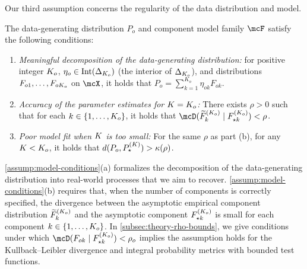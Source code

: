 
Our third assumption concerns the regularity of the data distribution and model.
\begin{assumption} \label{assump:model-conditions}
	The data-generating distribution $P_o$ and component model family $\mcF$ satisfy the following conditions:
	\begin{enumerate}[label=\textnormal{(\alph*)}]
		\item \emph{Meaningful decomposition of the data-generating distribution:} for positive integer $K_{o}$, $\eta_{o} \in \operatorname{Int}({\Delta_{K_o}})$ (the interior of $\Delta_{K_o}$), and distributions $F_{o1},\dots,F_{oK_{o}}$ on $\mcX$, it holds that $P_{o} = \sum_{k = 1}^{K_o}\eta_{ok}F_{ok}$.
		\item \emph{Accuracy of the parameter estimates for $K = K_{o}$:} There exists $\rho > 0$
		      such that for each $k \in \{1, \ldots, K_o\}$, it holds that
		      $\discr{\widetilde{F}_{k}^{(K_{o})}}{F^{(K_{o})}_{\star k}} < \rho$.
		\item \emph{Poor model fit when $K$ is too small:} For the same $\rho$ as part (b),
		      for any $K < K_o$, it holds that $d(P_o, P_{\star}^{(K)}) > \kappa(\rho) $.
	\end{enumerate}
\end{assumption}

\cref{assump:model-conditions}(a) formalizes the decomposition of the data-generating distribution into real-world processes that we aim to recover.
\cref{assump:model-conditions}(b) requires that, when the number of components is correctly specified,
the divergence between the asymptotic empirical component distribution $\widetilde{F}^{(K_{o})}_{k}$ and the asymptotic component
$F_{\star k}^{(K_{o})}$ is small for each component $k \in \{1,\ldots,K_{o}\}$.
In \cref{subsec:theory-rho-bounds}, we give conditions under which $\discr{F_{ok}}{F^{(K_{o})}_{\star k}} < \rho_{o}$
implies the assumption holds for the Kullback--Leibler divergence and integral probability metrics with bounded test functions. %

